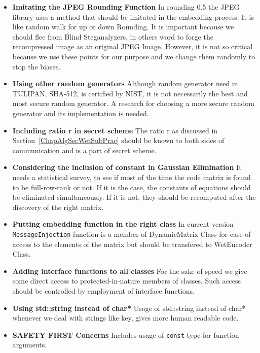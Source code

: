 \begin{itemize}
	   \item {\bf Imitating the JPEG Rounding Function} In rounding 0.5 the JPEG library uses a method that should be imitated in the embedding process. It is like random walk for up or down Rounding. It is important because we should flee from Blind Steganalyzers, in others word to forge the recompressed image as an original JPEG Image. However, it is not so critical because we use these points for our purpose and we change them randomly to stop the biases.
	   
	   \item {\bf Using other random generators} Although random generator used in TULIPAN, SHA-512, is certified by NIST, it is not necessarily the best and most secure random generator. A research for choosing a more secure random generator and its implementation is needed.

	     \item {\bf Including ratio r in secret scheme} The ratio r as discussed in Section~\ref{ChapAlgSecWetSubPrac} should be known to both sides of communication and is a part of secret scheme.

	   \item {\bf Considering the inclusion of constant in Gaussian Elimination}
It needs a statistical survey, to see if most of the time the code matrix is found to be full-row-rank or not. If it is the case, the constants of equations should be eliminated simultaneously. If it is not, they should be recomputed after the discovery of the right matrix.


	   \item {\bf Putting embedding function in the right class} 
In current version \texttt{MessageInjection} function is a member of DynamicMatrix Class for ease of access to the elements of the matrix but should be transfered to WetEncoder Class.

	   \item {\bf Adding interface functions to all classes} For the sake of speed we give some direct access to protected-in-nature members of classes. Such access should be controlled by employment of interface functions.

	   \item {\bf Using std::string instead of char* } Usage of  std::string instead of char* whenever we deal with strings like key, gives more human readable code.

	   \item {\bf SAFETY FIRST Concerns} Includes usage of \texttt{const} type for function arguments.


\end{itemize}

